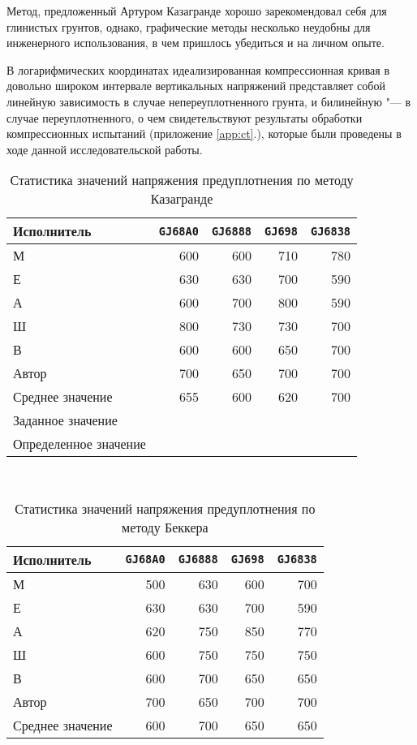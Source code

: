 Метод, предложенный Артуром Казагранде хорошо зарекомендовал себя для глинистых грунтов, однако, графические методы несколько неудобны для инженерного использования, в чем пришлось убедиться и на личном опыте.

В логарифмических координатах идеализированная компрессионная кривая в довольно широком интервале вертикальных напряжений представляет собой линейную зависимость в случае непереуплотненного грунта, и билинейную "--- в случае переуплотненного, о чем свидетельствуют результаты обработки компрессионных испытаний (приложение \ref{app:ct}.), которые были проведены в ходе данной исследовательской работы. 
%
%


\begin{table}[]
    \centering
    \caption{Статистика значений напряжения предуплотнения по методу Казагранде} \label{tab:expC}
    \begin{tabular}{@{}lrrrr@{}}
    \toprule
    Исполнитель & \texttt{GJ68A0} &	\texttt{GJ6888} & \texttt{GJ698} & \texttt{GJ6838}  \\ \midrule
    М	& 600	& 600	& 710	& 780 \\
    Е	& 630	& 630	& 700	& 590 \\
    А	& 600	& 700	& 800	& 590 \\
    Ш	& 800	& 730	& 730	& 700 \\
    В	& 600	& 600	& 650	& 700 \\
    Автор	& 700	& 650	& 700	& 700 \\  \midrule
    Среднее значение & 655& 600& 620 & 700\\
    Заданное значение & & &  & \\
    Определенное значение & & &  & \\
    
    \bottomrule 
    \end{tabular}
    \\ 
\end{table}


\begin{table}[]
    \centering
    \caption{Статистика значений напряжения предуплотнения по методу Беккера} \label{tab:expB}
    \begin{tabular}{@{}lrrrr@{}}
    \toprule
    Исполнитель & \texttt{GJ68A0} &	\texttt{GJ6888} & \texttt{GJ698} & \texttt{GJ6838}  \\ \midrule
    М	& 500	& 630	& 600	& 700 \\
    Е	& 630	& 630	& 700	& 590 \\
    А	& 620	& 750	& 850	& 770 \\
    Ш	& 600	& 750	& 750	& 750 \\
    В	& 600	& 700	& 650	& 650 \\
    Автор	& 700	& 650	& 700	& 700 \\ \midrule
    Среднее значение & 600 & 700 & 650 & 650 \\
    \bottomrule 
    \end{tabular}
    \\ 
\end{table}

